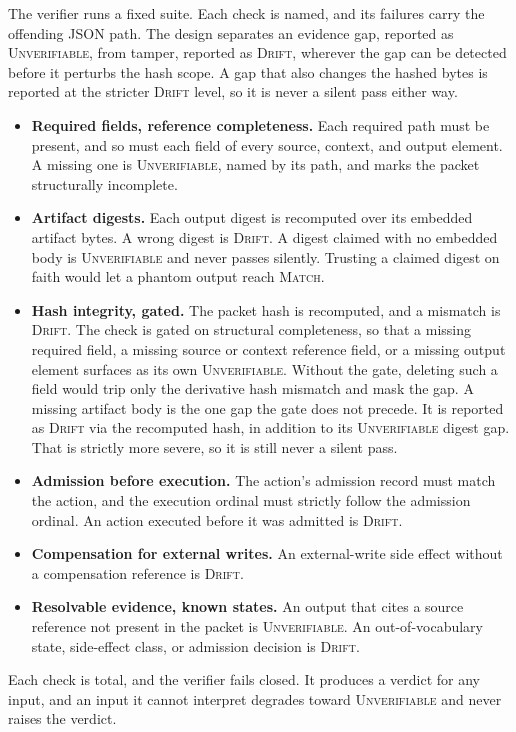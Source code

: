 \documentclass[11pt]{article}
\begin{document}
The verifier runs a fixed suite. Each check is named, and its failures carry the offending JSON path. The design separates an evidence gap, reported as \textsc{Unverifiable}, from tamper, reported as \textsc{Drift}, wherever the gap can be detected before it perturbs the hash scope. A gap that also changes the hashed bytes is reported at the stricter \textsc{Drift} level, so it is never a silent pass either way.
\begin{itemize}[leftmargin=*,itemsep=1pt]
\item \textbf{Required fields, reference completeness.} Each required path must be present, and so must each field of every source, context, and output element. A missing one is \textsc{Unverifiable}, named by its path, and marks the packet structurally incomplete.
\item \textbf{Artifact digests.} Each output digest is recomputed over its embedded artifact bytes. A wrong digest is \textsc{Drift}. A digest claimed with no embedded body is \textsc{Unverifiable} and never passes silently. Trusting a claimed digest on faith would let a phantom output reach \textsc{Match}.
\item \textbf{Hash integrity, gated.} The packet hash is recomputed, and a mismatch is \textsc{Drift}. The check is gated on structural completeness, so that a missing required field, a missing source or context reference field, or a missing output element surfaces as its own \textsc{Unverifiable}. Without the gate, deleting such a field would trip only the derivative hash mismatch and mask the gap. A missing artifact body is the one gap the gate does not precede. It is reported as \textsc{Drift} via the recomputed hash, in addition to its \textsc{Unverifiable} digest gap. That is strictly more severe, so it is still never a silent pass.
\item \textbf{Admission before execution.} The action's admission record must match the action, and the execution ordinal must strictly follow the admission ordinal. An action executed before it was admitted is \textsc{Drift}.
\item \textbf{Compensation for external writes.} An external-write side effect without a compensation reference is \textsc{Drift}.
\item \textbf{Resolvable evidence, known states.} An output that cites a source reference not present in the packet is \textsc{Unverifiable}. An out-of-vocabulary state, side-effect class, or admission decision is \textsc{Drift}.
\end{itemize}
Each check is total, and the verifier fails closed. It produces a verdict for any input, and an input it cannot interpret degrades toward \textsc{Unverifiable} and never raises the verdict.
\end{document}
